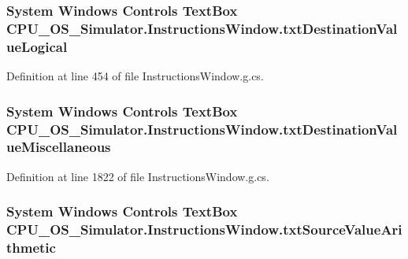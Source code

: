 \subsubsection[{txt\+Destination\+Value\+Logical}]{\setlength{\rightskip}{0pt plus 5cm}System Windows Controls Text\+Box C\+P\+U\+\_\+\+O\+S\+\_\+\+Simulator.\+Instructions\+Window.\+txt\+Destination\+Value\+Logical\hspace{0.3cm}{\ttfamily [package]}}\label{class_c_p_u___o_s___simulator_1_1_instructions_window_af1a2860f125c3a8e25c73c1b04290438}


Definition at line 454 of file Instructions\+Window.\+g.\+cs.

\hypertarget{class_c_p_u___o_s___simulator_1_1_instructions_window_a7fa1615bacb3264ac8ce61787a28d477}{}
\subsubsection[{txt\+Destination\+Value\+Miscellaneous}]{\setlength{\rightskip}{0pt plus 5cm}System Windows Controls Text\+Box C\+P\+U\+\_\+\+O\+S\+\_\+\+Simulator.\+Instructions\+Window.\+txt\+Destination\+Value\+Miscellaneous\hspace{0.3cm}{\ttfamily [package]}}\label{class_c_p_u___o_s___simulator_1_1_instructions_window_a7fa1615bacb3264ac8ce61787a28d477}


Definition at line 1822 of file Instructions\+Window.\+g.\+cs.

\hypertarget{class_c_p_u___o_s___simulator_1_1_instructions_window_afc01788dc74f761b6cce800975394d2e}{}
\subsubsection[{txt\+Source\+Value\+Arithmetic}]{\setlength{\rightskip}{0pt plus 5cm}System Windows Controls Text\+Box C\+P\+U\+\_\+\+O\+S\+\_\+\+Simulator.\+Instructions\+Window.\+txt\+Source\+Value\+Arithmetic\hspace{0.3cm}{\ttfamily [package]}}\label{class_c_p_u___o_s___simulator_1_1_instructions_window_afc01788dc74f761b6cce800975394d2e}


